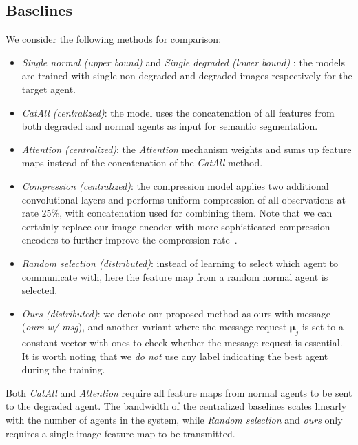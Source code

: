 \subsection{Baselines}
We consider the following methods for comparison:
\begin{itemize}
    \item \textit{Single normal (upper bound)} and \textit{Single degraded (lower bound) }: the models are trained with single non-degraded and degraded images respectively for the target agent.
    \item \textit{CatAll (centralized)}: the model uses the concatenation of all features from both degraded and normal agents as input for semantic segmentation.
    \item \textit{Attention (centralized)}:     the \textit{Attention} mechanism weights and sums up  feature maps instead of the concatenation of the \textit{CatAll} method. 
    \item \textit{Compression (centralized)}: the compression model applies two additional convolutional layers and performs uniform compression of all observations at rate $25\%$, with concatenation used for combining them. Note that we can certainly replace our image encoder with more sophisticated compression encoders to further improve the compression rate~\cite{cheng2019learning}.
    
    \item \textit{Random selection (distributed)}: 
    instead of learning to select which agent to communicate with, here the feature map from a random normal agent is selected.
    \item \textit{Ours (distributed)}: we denote our proposed method as ours with message (\textit{ours w/ msg}), and another variant where the message request $\bm{\mu}_j$ is set to a constant vector with ones to check whether the message request is essential. It is worth noting that we \textit{do not} use any label indicating the best agent during the training. 
\end{itemize}
Both \textit{CatAll} and \textit{Attention} require all feature maps from normal agents to be sent to the degraded agent. The bandwidth of the centralized baselines scales linearly with the number of agents in the system, while \textit{Random selection} and \textit{ours} only requires a single image feature map to be transmitted.

